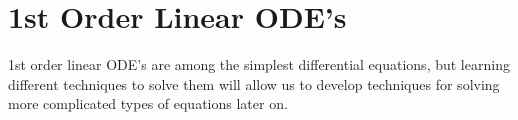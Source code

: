 \chapter{1st Order Linear ODE's}
\noindent
1st order linear ODE's are among the simplest differential equations, but learning different techniques to solve them will allow us to develop techniques for solving more complicated types of equations later on.





